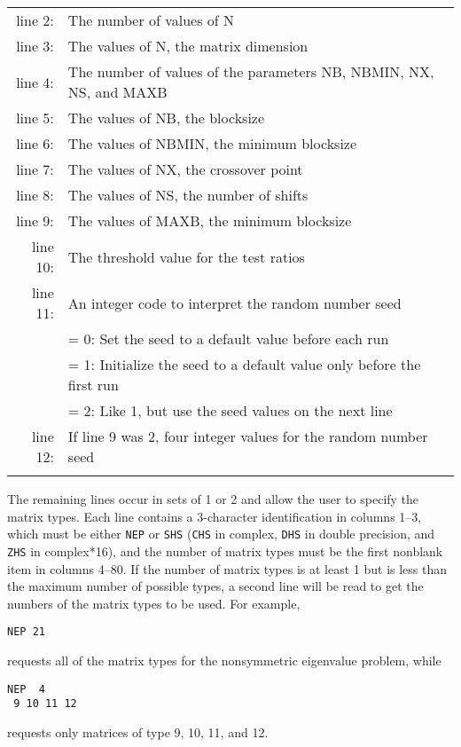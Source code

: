 \begin{tabular}{r l}
\\
line 2: & The number of values of N \\
line 3: & The values of N, the matrix dimension \\
line 4: & The number of values of the parameters NB, NBMIN, NX, NS, and MAXB \\
line 5: & The values of NB, the blocksize \\
line 6: & The values of NBMIN, the minimum blocksize \\
line 7: & The values of NX, the crossover point \\
line 8: & The values of NS, the number of shifts \\
line 9: & The values of MAXB, the minimum blocksize \\
line 10: & The threshold value for the test ratios \\
line 11: & An integer code to interpret the random number seed \\
        & = 0:  Set the seed to a default value before each run \\
        & = 1:  Initialize the seed to a default value only before the
first run \\
        & = 2:  Like 1, but use the seed values on the next line \\
line 12:& If line 9 was 2, four integer values for the random number
seed \\
   &
\end{tabular}

\noindent
The remaining lines occur in sets of 1 or 2 and allow
the user to specify the matrix types.  Each line contains
a 3-character identification in columns 1--3, which must be
either {\tt NEP} or {\tt SHS} ({\tt CHS} in complex, {\tt DHS} in
double precision, and {\tt ZHS} in complex*16),
and the number of matrix types must
be the first nonblank item in columns 4--80.  If the number
of matrix types is at least 1 but is less than the maximum
number of possible types, a second line will be read to get
the numbers of the matrix types to be used.  For example,

\begin{verbatim}
NEP 21
\end{verbatim}
requests all of the matrix types for the nonsymmetric
eigenvalue problem, while

\begin{verbatim}
NEP  4
 9 10 11 12
\end{verbatim}
requests only matrices of type 9, 10, 11, and 12.


